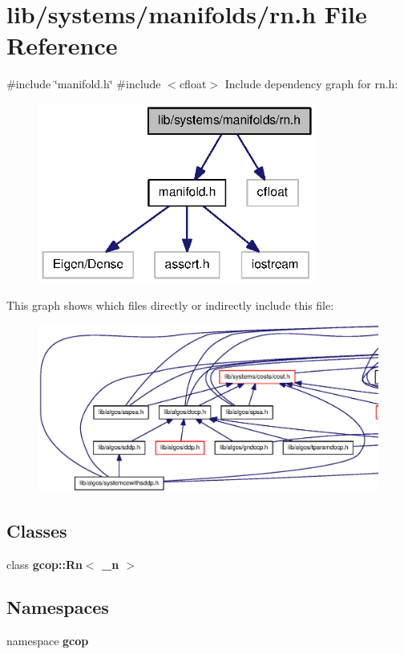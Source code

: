 \section{lib/systems/manifolds/rn.h \-File \-Reference}
\label{rn_8h}
{\ttfamily \#include \char`\"{}manifold.\-h\char`\"{}}\*
{\ttfamily \#include $<$cfloat$>$}\*
\-Include dependency graph for rn.\-h\-:\nopagebreak
\begin{figure}[H]
\begin{center}
\leavevmode
\includegraphics[width=259pt]{rn_8h__incl}
\end{center}
\end{figure}
\-This graph shows which files directly or indirectly include this file\-:\nopagebreak
\begin{figure}[H]
\begin{center}
\leavevmode
\includegraphics[width=350pt]{rn_8h__dep__incl}
\end{center}
\end{figure}
\subsection*{\-Classes}
\begin{DoxyCompactItemize}
\item 
class {\bf gcop\-::\-Rn$<$ \-\_\-n $>$}
\end{DoxyCompactItemize}
\subsection*{\-Namespaces}
\begin{DoxyCompactItemize}
\item 
namespace {\bf gcop}
\end{DoxyCompactItemize}
